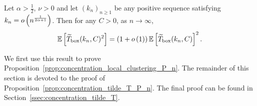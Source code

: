 %

\begin{proposition}\label{prop:concentration_tilde_T_P_n}
Let $\alpha > \frac{1}{2}$, $\nu > 0$ and let $(k_n)_{n \ge 1}$ be any positive sequence satisfying $k_n = o\left(n^{\frac{1}{2\alpha+1}}\right)$. Then for any $C > 0$, as $n \to \infty$,
\[
	\mathbb{E}\left[\widetilde{T}_{\text{box}}(k_n,C)^2\right] = \left(1 + o\left(1\right)\right)\mathbb{E}\left[\widetilde{T}_{\text{box}}(k_n, C)\right]^2.
\]
\end{proposition}

We first use this result to prove Proposition~\ref{prop:concentration_local_clustering_P_n}. The remainder of this section is devoted to the proof of Proposition~\ref{prop:concentration_tilde_T_P_n}. The final proof can be found in Section~\ref{ssec:concentration_tilde_T}.

